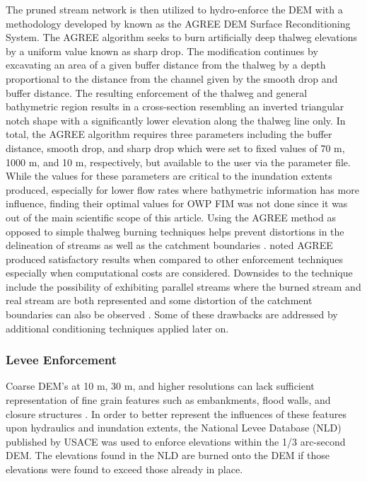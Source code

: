 \documentclass[draft]{dependencies/agujournal2019}
\begin{document}
%

The pruned stream network is then utilized to hydro-enforce the DEM with a methodology developed by  known as the AGREE DEM Surface Reconditioning System. 
The AGREE algorithm seeks to burn artificially deep thalweg elevations by a uniform value known as sharp drop. 
The modification continues by excavating an area of a given buffer distance from the thalweg by a depth proportional to the distance from the channel given by the smooth drop and buffer distance. 
The resulting enforcement of the thalweg and general bathymetric region results in a cross-section resembling an inverted triangular notch shape with a significantly lower elevation along the thalweg line only.
In total, the AGREE algorithm requires three parameters including the buffer distance, smooth drop, and sharp drop which were set to fixed values of 70 m, 1000 m, and 10 m, respectively, but available to the user via the parameter file.
While the values for these parameters are critical to the inundation extents produced, especially for lower flow rates where bathymetric information has more influence, finding their optimal values for OWP FIM was not done since it was out of the main scientific scope of this article.
Using the AGREE method as opposed to simple thalweg burning techniques helps prevent distortions in the delineation of streams as well as the catchment boundaries \cite{saunders1995grid,saunders1996gis,mizgalewicz1996modeling,hellweger1997agree,quenzer1998gis,baker2006comparison}.
 noted AGREE produced satisfactory results when compared to other enforcement techniques especially when computational costs are considered. 
Downsides to the technique include the possibility of exhibiting parallel streams where the burned stream and real stream are both represented \cite{hellweger1997agree,saunders1999preparation} and some distortion of the catchment boundaries can also be observed \cite{saunders1999preparation,saunders1996gis}.
Some of these drawbacks are addressed by additional conditioning techniques applied later on.
%
\subsubsection{Levee Enforcement}
%
Coarse DEM's at 10 m, 30 m, and higher resolutions can lack sufficient representation of fine grain features such as embankments, flood walls, and closure structures \cite{arundel2018assimilation,dobbs2010evaluation,wang2005comparison,sanders2007evaluation}.
In order to better represent the influences of these features upon hydraulics and inundation extents, the National Levee Database (NLD) published by USACE was used to enforce elevations within the 1/3 arc-second DEM.
The elevations found in the NLD are burned onto the DEM if those elevations were found to exceed those already in place.
%
\end{document}
